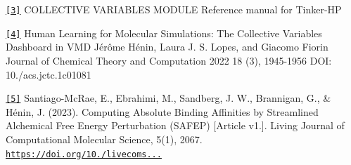 \href{https://colvars.github.io/master/colvars-refman-tinkerhp.pdf}{\tt \mbox{[}3\mbox{]}} C\-O\-L\-L\-E\-C\-T\-I\-V\-E V\-A\-R\-I\-A\-B\-L\-E\-S M\-O\-D\-U\-L\-E Reference manual for Tinker-\/\-H\-P

\href{=https://pubs.acs.org/doi/abs/10.1021/acs.jctc.1c01081}{\tt \mbox{[}4\mbox{]}} Human Learning for Molecular Simulations\-: The Collective Variables Dashboard in V\-M\-D Jérôme Hénin, Laura J. S. Lopes, and Giacomo Fiorin Journal of Chemical Theory and Computation 2022 18 (3), 1945-\/1956 D\-O\-I\-: 10./acs.jctc.\-1c01081

\href{https://livecomsjournal.org/index.php/livecoms/article/view/v5i1e2067}{\tt \mbox{[}5\mbox{]}} Santiago-\/\-Mc\-Rae, E., Ebrahimi, M., Sandberg, J. W., Brannigan, G., \& Hénin, J. (2023). Computing Absolute Binding Affinities by Streamlined Alchemical Free Energy Perturbation (S\-A\-F\-E\-P) \mbox{[}Article v1.\mbox{]}. Living Journal of Computational Molecular Science, 5(1), 2067. \href{https://doi.org/10.33011/livecoms.5.1.2067}{\tt https\-://doi.\-org/10./livecoms...} 